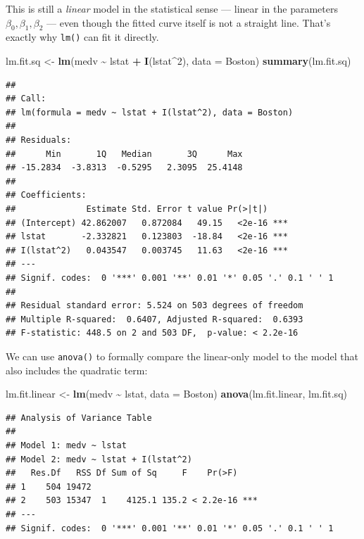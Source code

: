 \documentclass[
  11pt,
]{article}
\newenvironment{Shaded}{\begin{snugshade}}{\end{snugshade}}
\newcommand{\AttributeTok}[1]{\textcolor[rgb]{0.13,0.29,0.53}{#1}}
\newcommand{\DecValTok}[1]{\textcolor[rgb]{0.00,0.00,0.81}{#1}}
\newcommand{\FunctionTok}[1]{\textcolor[rgb]{0.13,0.29,0.53}{\textbf{#1}}}
\newcommand{\NormalTok}[1]{#1}
\newcommand{\OtherTok}[1]{\textcolor[rgb]{0.56,0.35,0.01}{#1}}
\newcommand{\SpecialCharTok}[1]{\textcolor[rgb]{0.81,0.36,0.00}{\textbf{#1}}}
\begin{document}
This is still a \emph{linear} model in the statistical sense --- linear
in the parameters \(\beta_0, \beta_1, \beta_2\) --- even though the
fitted curve itself is not a straight line. That's exactly why
\texttt{lm()} can fit it directly.

\begin{Shaded}
\begin{Highlighting}[]
\NormalTok{lm.fit.sq }\OtherTok{\textless{}{-}} \FunctionTok{lm}\NormalTok{(medv }\SpecialCharTok{\textasciitilde{}}\NormalTok{ lstat }\SpecialCharTok{+} \FunctionTok{I}\NormalTok{(lstat}\SpecialCharTok{\^{}}\DecValTok{2}\NormalTok{), }\AttributeTok{data =}\NormalTok{ Boston)}
\FunctionTok{summary}\NormalTok{(lm.fit.sq)}
\end{Highlighting}
\end{Shaded}

\begin{verbatim}
## 
## Call:
## lm(formula = medv ~ lstat + I(lstat^2), data = Boston)
## 
## Residuals:
##      Min       1Q   Median       3Q      Max 
## -15.2834  -3.8313  -0.5295   2.3095  25.4148 
## 
## Coefficients:
##              Estimate Std. Error t value Pr(>|t|)    
## (Intercept) 42.862007   0.872084   49.15   <2e-16 ***
## lstat       -2.332821   0.123803  -18.84   <2e-16 ***
## I(lstat^2)   0.043547   0.003745   11.63   <2e-16 ***
## ---
## Signif. codes:  0 '***' 0.001 '**' 0.01 '*' 0.05 '.' 0.1 ' ' 1
## 
## Residual standard error: 5.524 on 503 degrees of freedom
## Multiple R-squared:  0.6407, Adjusted R-squared:  0.6393 
## F-statistic: 448.5 on 2 and 503 DF,  p-value: < 2.2e-16
\end{verbatim}

We can use \texttt{anova()} to formally compare the linear-only model to
the model that also includes the quadratic term:

\begin{Shaded}
\begin{Highlighting}[]
\NormalTok{lm.fit.linear }\OtherTok{\textless{}{-}} \FunctionTok{lm}\NormalTok{(medv }\SpecialCharTok{\textasciitilde{}}\NormalTok{ lstat, }\AttributeTok{data =}\NormalTok{ Boston)}
\FunctionTok{anova}\NormalTok{(lm.fit.linear, lm.fit.sq)}
\end{Highlighting}
\end{Shaded}

\begin{verbatim}
## Analysis of Variance Table
## 
## Model 1: medv ~ lstat
## Model 2: medv ~ lstat + I(lstat^2)
##   Res.Df   RSS Df Sum of Sq     F    Pr(>F)    
## 1    504 19472                                 
## 2    503 15347  1    4125.1 135.2 < 2.2e-16 ***
## ---
## Signif. codes:  0 '***' 0.001 '**' 0.01 '*' 0.05 '.' 0.1 ' ' 1
\end{verbatim}
\end{document}
